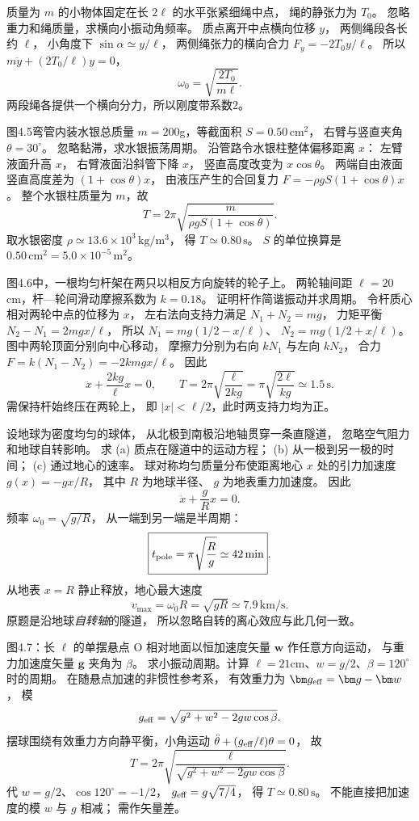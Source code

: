 质量为 $m$ 的小物体固定在长 $2\ell$ 的水平张紧细绳中点，
绳的静张力为 $T_0$。
忽略重力和绳质量，求横向小振动角频率。
\exsolution
质点离开中点横向位移 $y$，
两侧绳段各长约 $\ell$，
小角度下
$\sin\alpha\simeq y/\ell$，
两侧绳张力的横向合力
$F_y=-2T_0y/\ell$。
所以
$m\ddot y+(2T_0/\ell)y=0$，
\[
\boxed{\omega_0=\sqrt{\frac{2T_0}{m\ell}}}.
\]
\excheck 两段绳各提供一个横向分力，所以刚度带系数2。

图4.5弯管内装水银总质量
$m=200$g，等截面积
$S=0.50\,\mathrm{cm^2}$，
右臂与竖直夹角
$\theta=30^\circ$。
忽略黏滞，求水银振荡周期。
\exsolution
沿管路令水银柱整体偏移距离 $x$：
左臂液面升高 $x$，
右臂液面沿斜管下降 $x$，
竖直高度改变为 $x\cos\theta$。
两端自由液面竖直高度差为
$(1+\cos\theta)x$，
由液压产生的合回复力
$F=-\rho gS(1+\cos\theta)x$。
整个水银柱质量为 $m$，故
\[
\boxed{T=2\pi
\sqrt{\frac{m}{\rho gS(1+\cos\theta)}}}.
\]
取水银密度 $\rho\simeq13.6\times10^3\,\mathrm{kg/m^3}$，
得
$\boxed{T\simeq0.80\,\mathrm s}$。
\excheck $S$ 的单位换算是
$0.50\,\mathrm{cm^2}=5.0\times10^{-5}\,\mathrm{m^2}$。

图4.6中，一根均匀杆架在两只以相反方向旋转的轮子上。
两轮轴间距 $\ell=20$cm，杆—轮间滑动摩擦系数为
$k=0.18$。
证明杆作简谐振动并求周期。
\exsolution
令杆质心相对两轮中点的位移为 $x$，
左右法向支持力满足
$N_1+N_2=mg$，
力矩平衡
$N_2-N_1=2mgx/\ell$，
所以
$N_1=mg(1/2-x/\ell)$、
$N_2=mg(1/2+x/\ell)$。
图中两轮顶面分别向中心移动，
摩擦力分别为右向 $kN_1$ 与左向 $kN_2$，
合力
$F=k(N_1-N_2)=-2kmgx/\ell$。
因此
\[
\ddot x+\frac{2kg}{\ell}x=0,
\qquad
\boxed{T=2\pi\sqrt{\frac{\ell}{2kg}}
=\pi\sqrt{\frac{2\ell}{kg}}
\simeq1.5\,\mathrm s}.
\]
\excheck 需保持杆始终压在两轮上，
即 $|x|<\ell/2$，此时两支持力均为正。

设地球为密度均匀的球体，
从北极到南极沿地轴贯穿一条直隧道，
忽略空气阻力和地球自转影响。
求 (a) 质点在隧道中的运动方程；
(b) 从一极到另一极的时间；
(c) 通过地心的速率。
\exsolution
球对称均匀质量分布使距离地心 $x$ 处的引力加速度
$g(x)=-gx/R$，
其中 $R$ 为地球半径、
$g$ 为地表重力加速度。
因此
\[
\boxed{\ddot x+\frac gR x=0}.
\]
频率 $\omega_0=\sqrt{g/R}$，
从一端到另一端是半周期：
\[
\boxed{t_{\rm pole}=\pi\sqrt{\frac Rg}
\simeq42\,\mathrm{min}}.
\]
从地表 $x=R$ 静止释放，地心最大速度
\[
\boxed{v_{\max}=\omega_0R=\sqrt{gR}
\simeq7.9\,\mathrm{km/s}}.
\]
\excheck 原题是沿地球\emph{自转轴}的隧道，
所以忽略自转的离心效应与此几何一致。

图4.7：长 $\ell$ 的单摆悬点 O 相对地面以恒加速度矢量
$\bm w$ 作任意方向运动，
与重力加速度矢量 $\bm g$ 夹角为 $\beta$。
求小振动周期。计算
$\ell=21$cm、$w=g/2$、$\beta=120^\circ$ 时的周期。
\exsolution
在随悬点加速的非惯性参考系，
有效重力为
$\bm g_{\rm eff}=\bm g-\bm w$，
模
\[
g_{\rm eff}=\sqrt{g^2+w^2-2gw\cos\beta}.
\]
摆球围绕有效重力方向静平衡，小角运动
$\ddot\theta+(g_{\rm eff}/\ell)\theta=0$，
故
\[
\boxed{T=2\pi\sqrt{\frac{\ell}
{\sqrt{g^2+w^2-2gw\cos\beta}}}}.
\]
代 $w=g/2$、$\cos120^\circ=-1/2$，
$g_{\rm eff}=g\sqrt{7/4}$，
得
$\boxed{T\simeq0.80\,\mathrm s}$。
\excheck 不能直接把加速度的模 $w$ 与 $g$ 相减；
需作矢量差。

